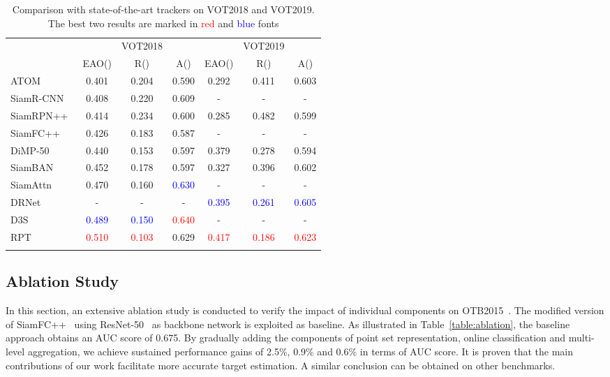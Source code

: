 \documentclass[runningheads]{llncs}
\begin{document}
\begin{table}
\begin{center}
\caption{Comparison with state-of-the-art trackers on VOT2018 and VOT2019. The best two results are marked in \textcolor{red}{red} and \textcolor{blue}{blue} fonts}
\label{table:vot}
\begin{tabular}{@{}l|ccc|ccc@{}}
\hline
&  &VOT2018 & &  &VOT2019 &\tabularnewline
& EAO() & R() & A() & EAO() & R() &
A()\tabularnewline
\hline
ATOM~\cite{atom} & 0.401&0.204 &0.590 &0.292 &0.411&0.603\tabularnewline
SiamR-CNN~\cite{siamrcnn} &0.408 &0.220 &0.609 &- &- &-\tabularnewline
SiamRPN++~\cite{siamrpn++} &0.414 &0.234 &0.600 &0.285 &0.482 &0.599\tabularnewline
SiamFC++~\cite{siamfc++} &0.426 &0.183 &0.587 &- &- &-\tabularnewline
DiMP-50~\cite{dimp} & 0.440&0.153 &0.597 & 0.379&0.278 &0.594\tabularnewline
SiamBAN~\cite{siamban} &0.452 &0.178 &0.597 &0.327 &0.396 &0.602\tabularnewline
SiamAttn~\cite{siamattn} &0.470 &0.160 &\textcolor{blue}{0.630} &- &- &-\tabularnewline
DRNet~\cite{VOT2019}&- &-&-&\textcolor{blue}{0.395}&\textcolor{blue}{0.261}&\textcolor{blue}{0.605}\tabularnewline
D3S~\cite{D3S}&\textcolor{blue}{0.489} &\textcolor{blue}{0.150}&\textcolor{red}{0.640}&-&-&-\tabularnewline
\hline
RPT & \textcolor{red}{0.510}& \textcolor{red}{0.103}&0.629 &\textcolor{red}{0.417} &\textcolor{red}{0.186} &\textcolor{red}{0.623}\tabularnewline
\hline\noalign{\smallskip}
\end{tabular}
\end{center}
\end{table}

\subsection{Ablation Study}\label{header-n50}

In this section, an extensive ablation study is conducted to verify the
impact of individual components on OTB2015~\cite{OTB2015}. The modified version of
SiamFC++~\cite{siamfc++} using ResNet-50~\cite{resnet50} as backbone network is exploited as baseline.
As illustrated in Table~\ref{table:ablation}, the baseline approach obtains an AUC score of
0.675. By gradually adding the components of point set representation,
online classification and multi-level aggregation, we achieve sustained
performance gains of 2.5\%, 0.9\% and 0.6\% in terms of AUC score. It is
proven that the main contributions of our work facilitate more accurate
target estimation. A similar conclusion can be obtained on other
benchmarks.
\end{document}
